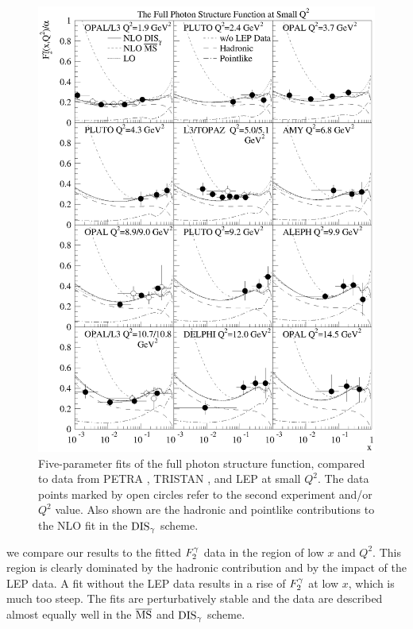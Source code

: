 \documentclass[aps,prl,twocolumn,groupedaddress]{revtex4}
\begin{document}
\begin{figure}
 \centering
 \includegraphics[width=0.9\columnwidth]{fig2}
 \caption{\label{fig:2}Five-parameter fits of the full photon structure
 function, compared to data from PETRA \cite{Berger:1984xt}, TRISTAN
 \cite{Kojima:1997wg,Muramatsu:1994rq}, and LEP \cite{Barate:1999qy,
 Abreu:1996xt,Acciarri:1998ig,%
 Ackerstaff:1997ni,
 Abbiendi:2000cw} at small $Q^2$. The data points marked by open
 circles refer to the second experiment and/or $Q^2$ value. Also shown are the
 hadronic and pointlike contributions to the NLO fit in the ${\rm DIS}_\gamma$ scheme.}
\end{figure}
%
we compare our results to the fitted $\f2y$ data in the region of low $x$
and $Q^2$. This region is clearly dominated by the hadronic contribution
and by the impact of the LEP data. A fit without the LEP data results in a rise
of $\f2y$ at low $x$, which is much too steep. The fits are perturbatively
stable and the data are described almost equally well in the $\overline{\rm MS}$ and ${\rm DIS}_\gamma$
scheme.
\end{document}
